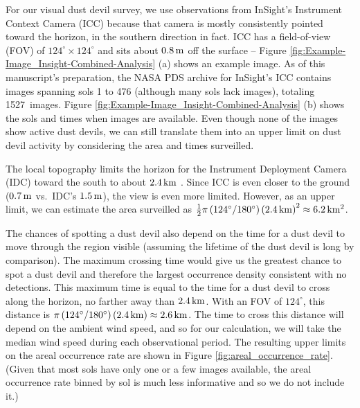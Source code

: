 \documentclass{aastex63}
\newcommand{\numICCimages}{1527}
\begin{document}
For our visual dust devil survey, we use observations from InSight's Instrument Context Camera (ICC) because that camera is mostly consistently pointed toward the horizon, in the southern direction in fact. ICC has a field-of-view (FOV) of $124^\circ\times124^\circ$ and sits about $0.8\,{\rm m}$ off the surface \citep{2018SSRv..214..105M} -- Figure \ref{fig:Example-Image_Insight-Combined-Analysis} (a) shows an example image. As of this manuscript's preparation, the NASA PDS archive for InSight's ICC contains images spanning sols 1 to 476 (although many sols lack images), totaling \numICCimages\ images. Figure \ref{fig:Example-Image_Insight-Combined-Analysis} (b) shows the sols and times when images are available. Even though none of the images show active dust devils, we can still translate them into an upper limit on dust devil activity by considering the area and times surveilled. 

The local topography limits the horizon for the Instrument Deployment Camera (IDC) toward the south to about $2.4\,{\rm km}$ \citep{2020E&SS....701248G}. Since ICC is even closer to the ground ($0.7\,{\rm m}$ vs.~IDC's $1.5\,{\rm m}$), the view is even more limited. However, as an upper limit, we can estimate the area surveilled as $\frac{1}{2} \pi \left(124^\circ/180^\circ\right) \left( 2.4\,{\rm km} \right)^2 \approx 6.2\,{\rm km^2}$. 

The chances of spotting a dust devil also depend on the time for a dust devil to move through the region visible (assuming the lifetime of the dust devil is long by comparison). The maximum crossing time would give us the greatest chance to spot a dust devil and therefore the largest occurrence density consistent with no detections. This maximum time is equal to the time for a dust devil to cross along the horizon, no farther away than $2.4\,{\rm km}$. With an FOV of $124^\circ$, this distance is $\pi \left(124^\circ/180^\circ\right) \left( 2.4\,{\rm km} \right) \approx 2.6\,{\rm km}$. The time to cross this distance will depend on the ambient wind speed, and so for our calculation, we will take the median wind speed during each observational period. The resulting upper limits on the areal occurrence rate are shown in Figure \ref{fig:areal_occurrence_rate}. (Given that most sols have only one or a few images available, the areal occurrence rate binned by sol is much less informative and so we do not include it.)
\end{document}
